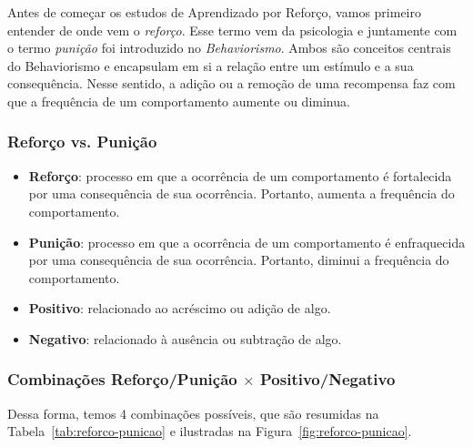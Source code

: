 \documentclass{article}
\begin{document}
            Antes de começar os estudos de Aprendizado por Reforço, vamos primeiro entender de onde vem o \emph{reforço}. Esse termo vem da psicologia e juntamente com o termo \emph{punição} foi introduzido no \emph{Behaviorismo}. Ambos são conceitos centrais do Behaviorismo e encapsulam em si a relação entre um estímulo e a sua consequência. Nesse sentido, a adição ou a remoção de uma recompensa faz com que a frequência de um comportamento aumente ou diminua.
        
            \subsubsection{Reforço vs. Punição}
            
                 \begin{itemize}
                     \item \textbf{Reforço}: processo em que a ocorrência de um comportamento é fortalecida por uma consequência de sua ocorrência. Portanto, aumenta a frequência do comportamento.
                     \item \textbf{Punição}: processo em que a ocorrência de um comportamento é enfraquecida por uma consequência de sua ocorrência. Portanto, diminui a frequência do comportamento.
                     \item \textbf{Positivo}: relacionado ao acréscimo ou adição de algo.
                     \item \textbf{Negativo}: relacionado à ausência ou subtração de algo.
                 \end{itemize}
                
            \subsubsection{Combinações Reforço/Punição \texorpdfstring{$\times$}{TEXT} Positivo/Negativo}
            
                Dessa forma, temos 4 combinações possíveis, que são resumidas na Tabela~\ref{tab:reforco-punicao} e ilustradas na Figura~\ref{fig:reforco-punicao}.
            
\end{document}
